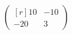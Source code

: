 \documentclass[nofonts]{ctexart}
\begin{document}
\[
	\begin{pmatrix*}[r]
		10	& -10	\\
		-20	& 3	
	\end{pmatrix*}
\]
\end{document}
